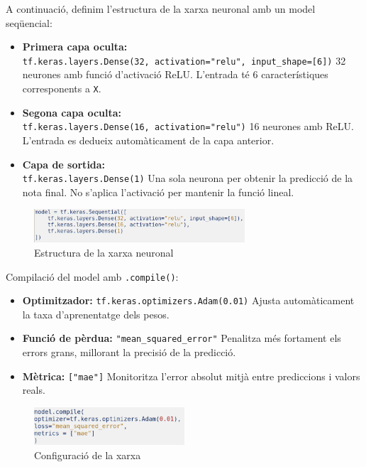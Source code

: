 A continuació, definim l’estructura de la xarxa neuronal amb un model seqüencial:

\begin{itemize}
\item \textbf{Primera capa oculta:}\\ \texttt{tf.keras.layers.Dense(32, activation="relu", input\_shape=[6])}
32 neurones amb funció d’activació ReLU. L’entrada té 6 característiques corresponents a \texttt{X}.
\item \textbf{Segona capa oculta:}\\ \texttt{tf.keras.layers.Dense(16, activation="relu")}
16 neurones amb ReLU. L’entrada es dedueix automàticament de la capa anterior.
\item \textbf{Capa de sortida:}\\ \texttt{tf.keras.layers.Dense(1)}
Una sola neurona per obtenir la predicció de la nota final. No s’aplica l'activació per mantenir la funció lineal.
\end{itemize}

\begin{figure}[h!]
\centering
\includegraphics[width=0.7\textwidth]{./figures/26.png}
\caption{Estructura de la xarxa neuronal}
\end{figure}

Compilació del model amb \texttt{.compile()}:

\begin{itemize}
\item \textbf{Optimitzador:} \texttt{tf.keras.optimizers.Adam(0.01)}
Ajusta automàticament la taxa d’aprenentatge dels pesos.
\item \textbf{Funció de pèrdua:} \texttt{"mean\_squared\_error"}
Penalitza més fortament els errors grans, millorant la precisió de la predicció.
\item \textbf{Mètrica:} \texttt{["mae"]}
Monitoritza l’error absolut mitjà entre prediccions i valors reals.
\end{itemize}

\begin{figure}[H]
\centering
\includegraphics[width=0.5\textwidth]{./figures/27.png}
\caption{Configuració de la xarxa}
\end{figure}


